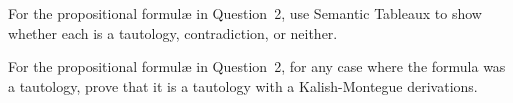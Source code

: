 \documentclass[12pt]{article}
\newenvironment{solution}[2][Solution]{ \begin{trivlist}
\item[\hskip \labelsep {\bfseries #1}]}{\end{trivlist}}
\newenvironment{problem}[2][Problem]{\begin{trivlist}
\item[\hskip \labelsep {\bfseries #1}\hskip \labelsep {\bfseries #2.}]}{\end{trivlist}}
\begin{document}
\begin{solution}{2}
\end{solution}


\pagebreak
\pagebreak
\begin{problem}{3}
For the propositional formul{\ae} in Question~2, use Semantic Tableaux to show whether each is a tautology, contradiction, or neither.
\end{problem}
\begin{solution}{3}
\item[]
\end{solution}
\vskip 0.5in
\newpage
\pagebreak
\pagebreak\newpage
\begin{problem}{4} For the propositional formul{\ae} in Question~2, for any case where the formula was a tautology, prove that it is a tautology with a Kalish-Montegue derivations.
\end{problem}
\begin{solution}{4}
\item[]
\end{solution}
\end{document}
